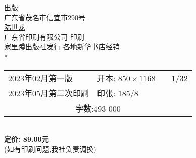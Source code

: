 \begin{center}
        {\makeatletter
    \fontsize{10}{10}\rmfamily\selectfont\@pressname 
    \makeatother}出版\\ 
    {\footnotesize 广东省茂名市信宜市290号}\\ 
    \href{https://www.lushilong.com}{陆世龙}\\ 
    {\fontsize{10}{10}\rmfamily\selectfont 广东省印刷有限公司} 印刷\\ 
    家里蹲出版社发行\hspace{2em} 各地新华书店经销\\ 
    \bigskip
    *\\
    \bigskip
    {\footnotesize\begin{tabular}{ll} 2023年02月第一版 & 开本: $850\times1168\quad \quad1/32$\\ 
    2023年05月第二次印刷 & 印张: $18 5/8$\\ 
    \multicolumn{2}{c}{字数:493 000}\\
    \end{tabular}}\\ 
    {\fontsize{10}{10}\rmfamily\bfseries\selectfont 定价: 89.00元}\\ 
    {\footnotesize (如有印刷问题,我社负责调换)}


    \end{center}






